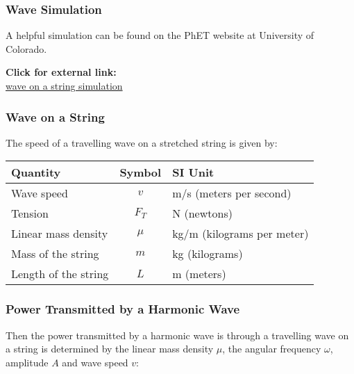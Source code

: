 \documentclass[12pt,aspectratio=169]{beamer}
\newcommand{\eq}[2]{\vspace{#1}{\Large\begin{displaymath}#2\end{displaymath}}}
\begin{document}
\begin{frame}
  \frametitle{Wave Simulation}
  A helpful simulation can be found on the PhET website at University of
  Colorado.
  \begin{center}
    \textbf{Click for external link:}\\
    \href{https://phet.colorado.edu/sims/html/wave-on-a-string/latest/wave-on-a-string_en.html}
         {wave on a string simulation}
  \end{center}
\end{frame}


\begin{frame}
  \frametitle{Wave on a String}
  The speed of a travelling wave on a stretched string is given by:

  \eq{-.2in}{
    \boxed{v=\sqrt{\frac{F_T}{\mu}}}
    \quad\text{\normalsize where}\quad
    \boxed{\mu=\frac{m}{L}}
  }
  \begin{center}
    \begin{tabular}{l|c|l}
      \rowcolor{pink}
      \textbf{Quantity} & \textbf{Symbol} & \textbf{SI Unit} \\ \hline
      Wave speed    & $v$    & \si{m/s} (meters per second) \\
      Tension       & $F_T$  & \si{\newton} (newtons)\\
      Linear mass density & $\mu$ & \si{\kilo\gram/\metre} (kilograms per meter)
      \\
      Mass of the string & $m$    & \si{\kilo\gram} (kilograms)\\
      Length of the string & $L$ & \si{\metre} (meters)
    \end{tabular}
  \end{center}
\end{frame}


\begin{frame}
  \frametitle{Power Transmitted by a Harmonic Wave}
  Then the power transmitted by a harmonic wave is through a travelling wave on
  a string is determined by the linear mass density $\mu$, the angular frequency
  $\omega$, amplitude $A$ and wave speed $v$:

  \eq{-.2in}{
    \boxed{P=\frac{1}{2}\mu\omega^2A^2v}
  }
\end{frame}
\end{document}
